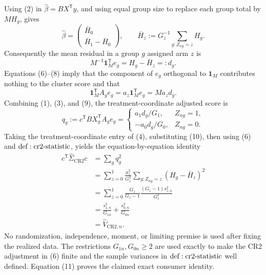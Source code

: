 Using (2) in \(\widehat\beta=BX^{\mathsf T}y\), and using equal group size to replace each group total by \(MH_g\), gives
\[
 \widehat\beta
 =\begin{pmatrix}\bar H_0\\ \bar H_1-\bar H_0\end{pmatrix},
 \qquad
 \bar H_z:=G_z^{-1}\sum_{g:Z_{ng}=z}H_g.
 \tag{7}
\]
Consequently the mean residual in a group \(g\) assigned arm \(z\) is
\[
 M^{-1}\mathbf 1_M^{\mathsf T}e_g=H_g-\bar H_z=:d_g.
 \tag{8}
\]
Equations (6)--(8) imply that the component of \(e_g\) orthogonal to \(\mathbf 1_M\) contributes nothing to the cluster score and that
\[
 \mathbf 1_M^{\mathsf T}A_ge_g
 =a_z\mathbf 1_M^{\mathsf T}e_g
 =Ma_zd_g.
 \tag{9}
\]
Combining (1), (3), and (9), the treatment-coordinate adjusted score is
\[
 q_g:=c^{\mathsf T}BX_g^{\mathsf T}A_ge_g
 =\begin{cases}
 a_1d_g/G_1,&Z_{ng}=1,\\
 -a_0d_g/G_0,&Z_{ng}=0.
 \end{cases}
 \tag{10}
\]
Taking the treatment-coordinate entry of (4), substituting (10), then using (6) and \({\rm def:cr2\text{-}statistic}\), yields the equation-by-equation identity
\[
 \begin{aligned}
 c^{\mathsf T}\widehat\Sigma_{\mathrm{CR2}}c
 &=\sum_gq_g^2\\
 &=\sum_{z=0}^1\frac{a_z^2}{G_z^2}
   \sum_{g:Z_{ng}=z}(H_g-\bar H_z)^2\\
 &=\sum_{z=0}^1
   \frac{G_z}{G_z-1}\frac{(G_z-1)s_{z,n}^2}{G_z^2}\\
 &=\frac{s_{1,n}^2}{G_{1n}}+\frac{s_{0,n}^2}{G_{0n}}\\
 &=\widehat V_{\mathrm{CR2},n}.
 \end{aligned}
 \tag{11}
\]
No randomization, independence, moment, or limiting premise is used after fixing the realized data.  The restrictions \(G_{1n},G_{0n}\ge2\) are used exactly to make the CR2 adjustment in (6) finite and the sample variances in \({\rm def:cr2\text{-}statistic}\) well defined.  Equation (11) proves the claimed exact consumer identity.
